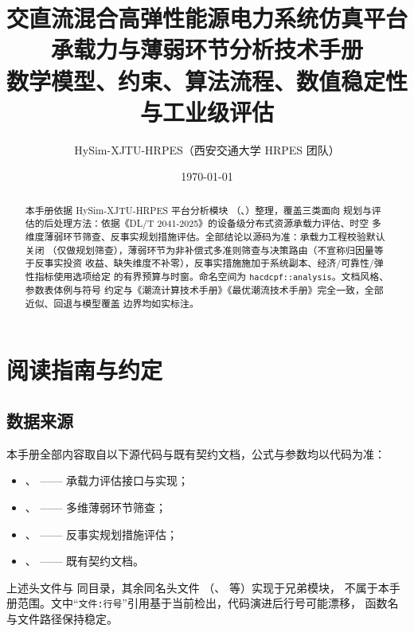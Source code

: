 \documentclass[UTF8,fontset=fandol,a4paper,11pt]{ctexart}
\title{\textbf{交直流混合高弹性能源电力系统仿真平台}\\[0.5em]
       {\Large 承载力与薄弱环节分析技术手册}\\[0.3em]
       {\large 数学模型、约束、算法流程、数值稳定性与工业级评估}}
\author{HySim-XJTU-HRPES（西安交通大学 HRPES 团队）}
\date{\today}
\begin{document}
\maketitle
\begin{abstract}
\noindent 本手册依据 HySim-XJTU-HRPES 平台分析模块
（、）整理，覆盖三类面向
规划与评估的后处理方法：依据《DL/T 2041-2025》的设备级分布式资源承载力评估、时空
多维度薄弱环节筛查、反事实规划措施评估。全部结论以源码为准：承载力工程校验默认关闭
（仅做规划筛查），薄弱环节为非补偿式多准则筛查与决策路由（不宣称归因量等于反事实投资
收益、缺失维度不补零），反事实措施施加于系统副本、经济/可靠性/弹性指标使用选项给定
的有界预算与时窗。命名空间为 \texttt{hacdcpf::analysis}。文档风格、参数表体例与符号
约定与《潮流计算技术手册》《最优潮流技术手册》完全一致，全部近似、回退与模型覆盖
边界均如实标注。
\end{abstract}

\tableofcontents
\newpage

\section{阅读指南与约定}
\subsection{数据来源}
本手册全部内容取自以下源代码与既有契约文档，公式与参数均以代码为准：
\begin{itemize}
  \item {}、
         —— 承载力评估接口与实现；
  \item {}、
         —— 多维薄弱环节筛查；
  \item {}、
         —— 反事实规划措施评估；
  \item {}、
         —— 既有契约文档。
\end{itemize}
上述头文件与  同目录，其余同名头文件
（、 等）实现于兄弟模块，
不属于本手册范围。文中“\texttt{文件:行号}”引用基于当前检出，代码演进后行号可能漂移，
函数名与文件路径保持稳定。
\end{document}
